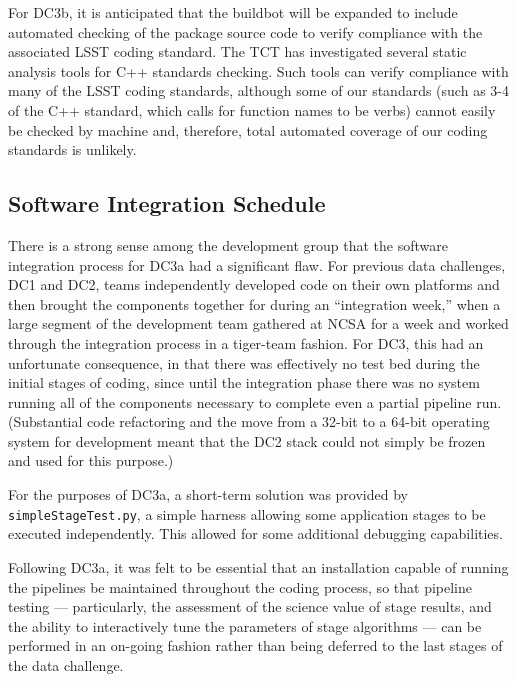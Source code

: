 For DC3b, it is anticipated that the buildbot will be expanded to include
automated checking of the package source code to verify compliance with
the associated LSST coding standard. The TCT has investigated several
static analysis tools for C++ standards checking. Such tools can verify
compliance with many of the LSST coding standards, although some of
our standards (such as 3-4 of the C++ standard, which calls for function
names to be verbs) cannot easily be checked by machine and, therefore,
total automated coverage of our coding standards is unlikely.

\subsection{Software Integration Schedule}

There is a strong sense among the development group that the software
integration process for DC3a had a significant flaw. For previous data
challenges, DC1 and DC2, teams independently developed code on their own
platforms and then brought the components together for during an ``integration
week,'' when a large segment of the development team gathered at NCSA for a week
and worked through the integration process in a tiger-team fashion. For DC3,
this had an unfortunate consequence, in that there was effectively no test bed
during the initial stages of coding, since until the integration phase
there was no system running all of the components necessary to complete 
even a partial pipeline run. (Substantial code refactoring and the move
from a 32-bit to a 64-bit operating system for development meant that the 
DC2 stack could not simply be frozen and used for this purpose.)

For the purposes of DC3a, a short-term solution was provided by
\texttt{simpleStageTest.py}, a simple harness allowing some application stages
to be executed independently. This allowed for some additional debugging
capabilities.

Following DC3a, it was felt to be essential that an installation capable
of running the pipelines be maintained throughout the coding process,
so that pipeline testing --- particularly, the assessment of the 
science value of stage results, and the ability to interactively tune
the parameters of stage algorithms --- can be performed in an on-going fashion
rather than being deferred to the last stages of the data challenge.


